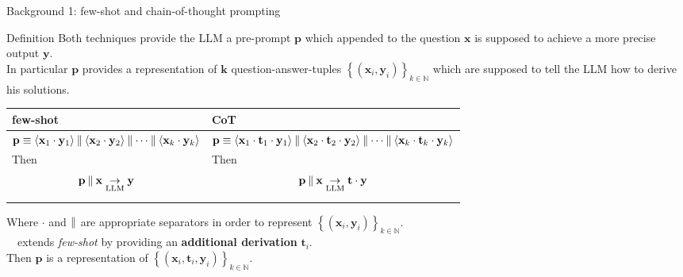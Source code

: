 \begin{frame}{Background 1: few-shot and chain-of-thought prompting}
\begin{block}{Definition}
Both techniques provide the LLM a pre-prompt \(\mathbf{p}\) which appended to the question \(\mathbf{x}\) is supposed to achieve a more precise output \(\mathbf{y}\). \\
In particular \(\mathbf{p}\) provides a representation of \(\mathbf{k}\) question-answer-tuples \(\left\{(\mathbf{x}_i, \mathbf{y}_i)\right\}_{k\in \mathds{N}}\)
which are supposed to tell the LLM how to derive his solutions.
\end{block}
\begin{table}
\small
\begin{tabular}{@{}p{} | p{}@{}}
\toprule
\textbf{few-shot} & \textbf{CoT} \\
\midrule
\(\mathbf{p} \equiv \langle \mathbf{x}_1 \cdot \mathbf{y}_1 \rangle \concat \langle \mathbf{x}_2 \cdot \mathbf{y}_2 \rangle \concat \dots \concat \langle \mathbf{x}_k \cdot \mathbf{y}_k \rangle\) & \(\mathbf{p} \equiv \langle \mathbf{x}_1 \cdot \mathbf{t}_1 \cdot \mathbf{y}_1 \rangle \concat \langle \mathbf{x}_2 \cdot \mathbf{t}_2 \cdot \mathbf{y}_2 \rangle \concat \dots \concat \langle \mathbf{x}_k \cdot \mathbf{t}_k \cdot \mathbf{y}_k \rangle\)\\
Then  \[\mathbf{p} \mathbin{\|} \mathbf{x} \underset{\text{LLM}}{\rightarrow} \mathbf{y}\] & Then \[\mathbf{p} \mathbin{\|} \mathbf{x} \underset{\text{LLM}}{\rightarrow} \mathbf{t} \cdot \mathbf{y}\] 
\end{tabular}
\end{table}
Where \(\cdot\) and \(\mathbin{\|}\) are appropriate separators in order to represent \(\left\{(\mathbf{x}_i, \mathbf{y}_i)\right\}_{k\in \mathds{N}}\).\\
\textrightarrow\ \CoT\ extends \textit{few-shot} by providing an \textbf{additional derivation} \(\mathbf{t}_i\). \\
Then \(\mathbf{p}\) is a representation of \(\left\{(\mathbf{x}_i, \mathbf{t}_i, \mathbf{y}_i)\right\}_{k\in \mathds{N}}\).

\end{frame}